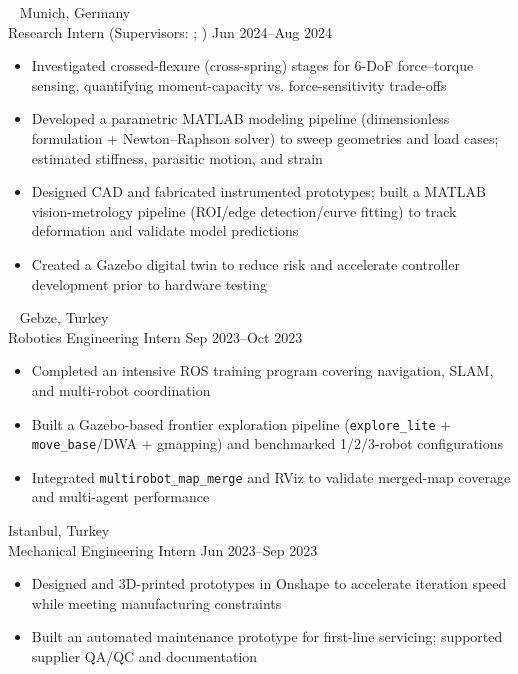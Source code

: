 \textbf{} \textbar\  \hfill Munich, Germany\\
Research Intern (Supervisors: ; ) \hfill Jun 2024--Aug 2024
\begin{itemize}
  \item Investigated crossed-flexure (cross-spring) stages for 6-DoF force--torque sensing, quantifying moment-capacity vs. force-sensitivity trade-offs
  \item Developed a parametric MATLAB modeling pipeline (dimensionless formulation + Newton--Raphson solver) to sweep geometries and load cases; estimated stiffness, parasitic motion, and strain
  \item Designed CAD and fabricated instrumented prototypes; built a MATLAB vision-metrology pipeline (ROI/edge detection/curve fitting) to track deformation and validate model predictions
  \item Created a Gazebo digital twin to reduce risk and accelerate controller development prior to hardware testing
\end{itemize}
\entrysep

\textbf{} \textbar\  \hfill Gebze, Turkey\\
Robotics Engineering Intern \hfill Sep 2023--Oct 2023
\begin{itemize}
  \item Completed an intensive ROS training program covering navigation, SLAM, and multi-robot coordination
  \item Built a Gazebo-based frontier exploration pipeline (\texttt{explore\_lite} + \texttt{move\_base}/DWA + gmapping) and benchmarked 1/2/3-robot configurations
  \item Integrated \texttt{multirobot\_map\_merge} and RViz to validate merged-map coverage and multi-agent performance
\end{itemize}
\entrysep

\textbf{} \hfill Istanbul, Turkey\\
Mechanical Engineering Intern \hfill Jun 2023--Sep 2023
\begin{itemize}
  \item Designed and 3D-printed prototypes in Onshape to accelerate iteration speed while meeting manufacturing constraints
  \item Built an automated maintenance prototype for first-line servicing; supported supplier QA/QC and documentation
\end{itemize}
